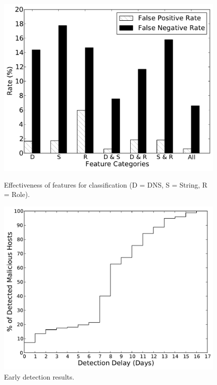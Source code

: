 \begin{figure}[t]
\centering
\begin{minipage}{.48\textwidth}
    \includegraphics[width=1\textwidth,height=.8\textwidth]{inclusion/figures/detection_rate}
    \caption{Effectiveness of features for classification (D = DNS, S = String, R = Role).}
    \label{inclusion:fig:eval:detection_rate}
\end{minipage}
\hfill
\begin{minipage}{.48\textwidth}
    \includegraphics[width=1\textwidth,height=.8\textwidth]{inclusion/figures/early_detection}
    \caption{Early detection results.\newline}
    \label{inclusion:fig:eval:early_detection}
\end{minipage}
\end{figure}

